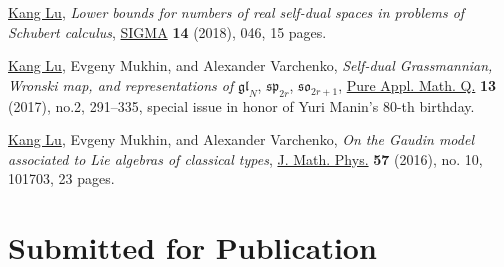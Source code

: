 \documentclass[11pt,letterpaper,roman,colorlinks,urlcolor=blue,linkcolor=blue
]{moderncv}
\begin{document}
\begin{etaremune}[leftmargin=1.17cm]
\item \underline{Kang Lu}, {\textit{Lower bounds for numbers of real self-dual spaces in problems of Schubert calculus}}, \href{https://doi.org/10.3842/SIGMA.2018.046}{SIGMA} {\textbf{14}} (2018), 046, 15 pages. 
            
\item \underline{Kang Lu}, Evgeny Mukhin, and Alexander Varchenko, {\textit{Self-dual Grassmannian, Wronski map, and representations of} $\mathfrak{gl}_N$, $\mathfrak{sp}_{2r}$, $\mathfrak{so}_{2r+1}$}, \href{http://dx.doi.org/10.4310/PAMQ.2017.v13.n2.a4}{Pure Appl. Math. Q.} {\textbf{13}} (2017), no.2, 291--335, special issue in honor of Yuri Manin's 80-th birthday.
                    
\item \underline{Kang Lu}, Evgeny Mukhin, and Alexander Varchenko, {\textit{On the Gaudin model associated to Lie algebras of classical types}}, \href{https://doi.org/10.1063/1.4964389}{J. Math. Phys.} {\textbf{57}} (2016), no. 10, 101703, 23 pages.
\end{etaremune}
        
\section{Submitted for Publication}
\end{document}
